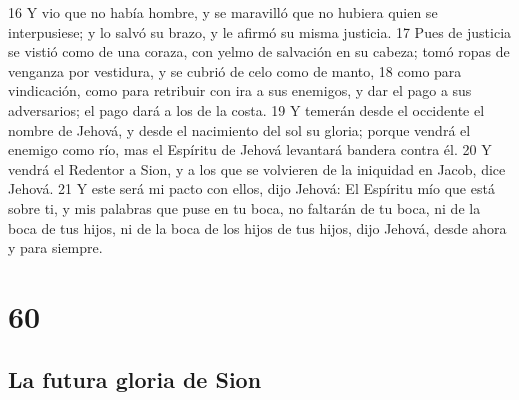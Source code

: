 16 Y vio que no había hombre, y se maravilló que no hubiera quien se interpusiese; y lo salvó su brazo, y le afirmó su misma justicia. 
17 Pues de justicia se vistió como de una coraza, con yelmo de salvación en su cabeza; tomó ropas de venganza por vestidura, y se cubrió de celo como de manto,
18 como para vindicación, como para retribuir con ira a sus enemigos, y dar el pago a sus adversarios; el pago dará a los de la costa.
19 Y temerán desde el occidente el nombre de Jehová, y desde el nacimiento del sol su gloria; porque vendrá el enemigo como río, mas el Espíritu de Jehová levantará bandera contra él.
20 Y vendrá el Redentor a Sion, y a los que se volvieren de la iniquidad en Jacob, dice Jehová.
21 Y este será mi pacto con ellos, dijo Jehová: El Espíritu mío que está sobre ti, y mis palabras que puse en tu boca, no faltarán de tu boca, ni de la boca de tus hijos, ni de la boca de los hijos de tus hijos, dijo Jehová, desde ahora y para siempre.

\chapter{60}

\section*{La futura gloria de Sion}

